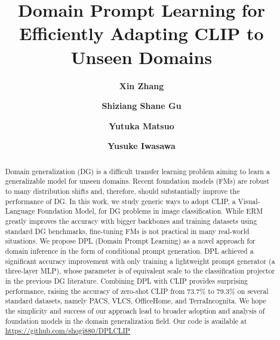 \documentclass[11pt,twocolumn]{article}
\title{\textbf {Domain Prompt Learning for Efficiently Adapting CLIP to Unseen Domains}}
\author[1]{\textbf{Xin Zhang}}
\author[1,2]{\textbf{Shiziang Shane Gu}}
\author[1]{\textbf{Yutuka Matsuo}}
\author[1]{\textbf{Yusuke Iwasawa}}
\affil[1]{The University of Tokyo}
\affil[2]{Google Research, Brain Team}
\makeatletter
\def\blfootnote{\xdef\@thefnmark{}\@footnotetext}
\makeatother
\begin{document}
\maketitle
\blfootnote{\url{xin@weblab.t.u-tokyo.ac.jp}}
\begin{abstract}
Domain generalization (DG) is a difficult transfer learning problem aiming to learn a generalizable model for unseen domains. Recent foundation models (FMs) are robust to many distribution shifts and, therefore, should substantially improve the performance of DG. In this work, we study generic ways to adopt CLIP, a Visual-Language Foundation Model, for DG problems in image classification. While ERM greatly improves the accuracy with bigger backbones and training datasets using standard DG benchmarks, fine-tuning FMs is not practical in many real-world situations. We propose DPL (Domain Prompt Learning) as a novel approach for domain inference in the form of conditional prompt generation. DPL achieved a significant accuracy improvement with only training a lightweight prompt generator (a three-layer MLP), whose parameter is of equivalent scale to the classification projector in the previous DG literature. Combining DPL with CLIP provides surprising performance, raising the accuracy of zero-shot CLIP from 73.7\% to 79.3\% on several standard datasets, namely PACS, VLCS, OfficeHome, and TerraIncognita. We hope the simplicity and success of our approach lead to broader adoption and analysis of foundation models in the domain generalization field. Our code is available at \url{https://github.com/shogi880/DPLCLIP}
\end{abstract}
\end{document}
